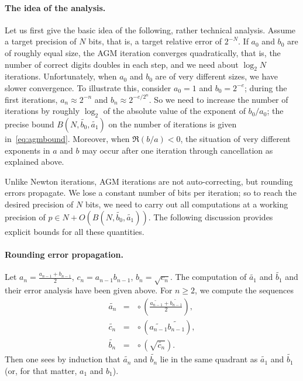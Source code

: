 \documentclass [11pt]{article}
\newcommand {\corr}[1]{{#1}}
\newcommand {\appro}[1]{\widetilde {#1}}
\newcommand {\round}{\operatorname {\circ}}
\renewcommand {\geq}{\geqslant}
\begin{document}
\paragraph {The idea of the analysis.}

Let us first give the basic idea of the following, rather technical
analysis.
Assume a target precision of $N$ bits, that is, a target relative error
of $2^{-N}$. If $a_0$ and $b_0$ are of roughly equal size, the AGM
iteration converges quadratically, that is, the number of correct digits
doubles in each step, and we need about $\log_2 N$ iterations.
Unfortunately, when $a_0$ and $b_0$ are of very different sizes, we have
slower convergence. To illustrate this, consider $a_0 = 1$ and
$b_0 = 2^{-e}$; during the first
iterations, $a_n \approx 2^{-n}$ and $b_n \approx 2^{-e/2^n}$. So we need
to increase the number of iterations by roughly $\log_2$ of the absolute
value of the exponent of $b_0/a_0$; the precise bound
$B \left( N, \appro {b_0}, \appro {a_1} \right)$ on
the number of iterations is given in~\eqref {eq:agmbound}.
Moreover, when $\Re (b/a) < 0$, the situation of very different exponents
in $a$ and $b$ may occur after one iteration through cancellation as
explained above.

Unlike Newton iterations, AGM iterations are not auto-correcting, but
rounding errors propagate. We lose a constant number of bits per iteration;
so to reach the desired precision of $N$ bits, we need to carry out all
computations at a working precision of
$p \in N + O \left( B (N, \appro {b_0}, \appro {a_1}) \right)$.
The following discussion provides explicit bounds for all these quantities.


\paragraph {Rounding error propagation.}

Let
$\corr {a_n} = \frac {\corr {a_{n-1}} + \corr {b_{n-1}}}{2}$,
$\corr {c_n} = \corr {a_{n-1}} \corr {b_{n-1}}$,
$\corr {b_n} = \sqrt {\corr {c_n}}$.
The computation of $\appro {a_1}$ and $\appro {b_1}$ and their error
analysis have been given above.
For $n \geq 2$, we compute the sequences
\begin {eqnarray*}
\appro {a_n}
& = & \round \left( \frac {\appro {a_{n-1}} + \appro {b_{n-1}}}{2} \right), \\
\appro {c_n}
& = & \round \left( \appro {a_{n-1}} \appro {b_{n-1}} \right), \\
\appro {b_n}
& = & \round \left( \sqrt {\appro {c_n}} \right).
\end {eqnarray*}
Then one sees by induction that
$\appro {a_n}$ and $\appro {b_n}$ lie in the same quadrant as
$\appro {a_1}$ and $\appro {b_1}$
(or, for that matter, $\corr {a_1}$ and $\corr {b_1}$).
\end{document}
